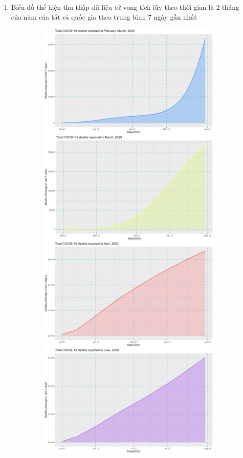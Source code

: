 \documentclass[a4paper]{article}
\theoremstyle{definition}
\begin{document}
\begin{enumerate}[i)]
\begin{enumerate}[1)]
\begin{figure}[H]
			\end{figure}
			\item Biểu đồ thể hiện thu thập dữ liệu tử vong tích lũy theo thời gian là 2 tháng của năm của tất cả quốc gia theo trung bình 7 ngày gần nhất
			\begin{figure}[H]
				\centering
				\includegraphics[height=23cm,width=13cm]{images/8.6.1.png}
			\end{figure}
			\begin{figure}[H]
				\centering

\end{figure}
\end{enumerate}
\end{enumerate}
\end{document}
